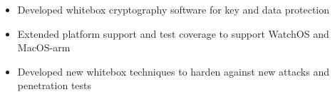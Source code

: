 \begin{itemize}
    \item Developed whitebox cryptography software for key and data protection
    \item Extended platform support and test coverage to support WatchOS and \\MacOS-arm
    \item Developed new whitebox techniques to harden against new attacks and \\penetration tests
\end{itemize}

